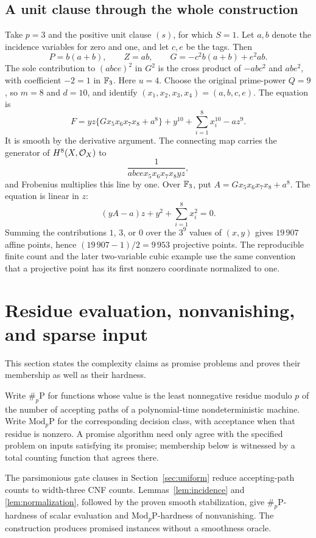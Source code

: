 \subsection{A unit clause through the whole construction}
\label{sec:unit-clause}
Take $p=3$ and the positive unit clause $(s)$, for which $S=1$. Let $a,b$ denote the incidence variables for zero and one, and let $c,e$ be the tags. Then
\[
P=b(a+b),\qquad Z=ab,\qquad
G=-c^2b(a+b)+e^2ab.
\]
The sole contribution to $(abce)^2$ in $G^2$ is the cross product of $-abc^2$ and $abe^2$, with coefficient $-2=1$ in $\mathbb F_3$. Here $u=4$. Choose the original prime-power $Q=9$, so $m=8$ and $d=10$, and identify $(x_1,x_2,x_3,x_4)=(a,b,c,e)$. The equation is
\[
F=yz\{Gx_5x_6x_7x_8+a^8\}
  +y^{10}+\sum_{i=1}^{8}x_i^{10}-az^9.
\]
It is smooth by the derivative argument. The connecting map carries the generator of $H^8(X,\mathcal O_X)$ to
\[
\frac1{abcex_5x_6x_7x_8yz},
\]
and Frobenius multiplies this line by one. Over $\mathbb F_3$, put $A=Gx_5x_6x_7x_8+a^8$. The equation is linear in $z$:
\[
(yA-a)z+y^2+\sum_{i=1}^{8}x_i^2=0.
\]
Summing the contributions $1$, $3$, or $0$ over the $3^9$ values of $(x,y)$ gives $19\,907$ affine points, hence $(19\,907-1)/2=9\,953$ projective points. The reproducible finite count and the later two-variable cubic example use the same convention that a projective point has its first nonzero coordinate normalized to one.

\section{Residue evaluation, nonvanishing, and sparse input}
This section states the complexity claims as promise problems and proves their membership as well as their hardness.

Write $\#_p\mathrm P$ for functions whose value is the least nonnegative residue modulo $p$ of the number of accepting paths of a polynomial-time nondeterministic machine. Write $\mathrm{Mod}_p\mathrm P$ for the corresponding decision class, with acceptance when that residue is nonzero. A promise algorithm need only agree with the specified problem on inputs satisfying its promise; membership below is witnessed by a total counting function that agrees there.

The parsimonious gate clauses in Section~\ref{sec:uniform} reduce accepting-path counts to width-three CNF counts. Lemmas~\ref{lem:incidence} and \ref{lem:normalization}, followed by the proven smooth stabilization, give $\#_p\mathrm P$-hardness of scalar evaluation and $\mathrm{Mod}_p\mathrm P$-hardness of nonvanishing. The construction produces promised instances without a smoothness oracle.

